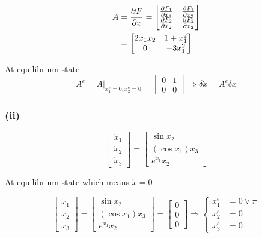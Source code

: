 \documentclass[12pt,a4paper]{article}
\begin{document}
\begin{align*}
	A &= {\partial F \over \partial x} = \begin{bmatrix}
		{\partial F_1 \over \partial x_1} & {\partial F_1 \over \partial x_2} \\
		{\partial F_2 \over \partial x_2} & {\partial F_2 \over \partial x_2}
	\end{bmatrix} \\
	&= \begin{bmatrix}
		2x_1x_2 & 1 + x_1^2 \\
		0 & -3x_1^2
	\end{bmatrix}
\end{align*}

At equilibrium state
\[
A^e = A\bigg|_{x^e_1 = 0 , x_2^e = 0} = \begin{bmatrix}
	0 & 1 \\ 0 & 0
\end{bmatrix} \Rightarrow \delta \dot x = A^e \delta x
\]


\subsubsection*{(ii)}

\[
\begin{bmatrix}
	\dot x_1 \\ \dot x_2 \\ \dot x_3
\end{bmatrix} = \begin{bmatrix}
\sin x_2 \\ (\cos x_1) x_3 \\ e^{x_1} x_2
\end{bmatrix}
\]

At equilibrium state which means $\dot x = 0$

\[
\begin{bmatrix}
	\dot x_1 \\ \dot x_2 \\ \dot x_3
\end{bmatrix} = \begin{bmatrix}
	\sin x_2 \\ (\cos x_1) x_3 \\ e^{x_1} x_2
\end{bmatrix} = \begin{bmatrix}
0 \\ 0 \\ 0
\end{bmatrix} \Rightarrow \begin{cases}
x_1^e &= 0 \lor \pi \\
x_2^e &= 0 \\ 
x_3^e &= 0 
\end{cases}
\]
\end{document}
